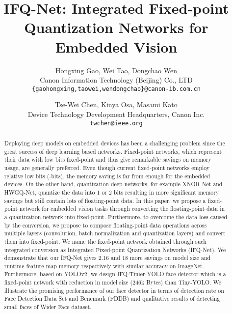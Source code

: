 \documentclass[10pt,twocolumn,letterpaper]{article}
\begin{document}
\title{IFQ-Net: Integrated Fixed-point Quantization Networks for Embedded Vision}


\author{Hongxing Gao, Wei Tao, Dongchao Wen\\
Canon Information Technology (Beijing) Co., LTD\\
{\tt\small \{gaohongxing,taowei,wendongchao\}@canon-ib.com.cn}
\and
Tse-Wei Chen, Kinya Osa, Masami Kato\\
Device Technology Development Headquarters, Canon Inc.\\
{\tt\small twchen@ieee.org}
}

\maketitle
\thispagestyle{empty}


\begin{abstract}
Deploying deep models on embedded devices has been a challenging problem since the great success of deep learning based networks. Fixed-point networks, which represent their data with low bits fixed-point and thus give remarkable savings on memory usage, are generally preferred. Even though current fixed-point networks employ relative low bits (-bits), the memory saving is far from enough for the embedded devices. On the other hand, quantization deep networks, for example XNOR-Net and HWGQ-Net, quantize the data into 1 or 2 bits resulting in more significant memory savings but still contain lots of floating-point data. In this paper, we propose a fixed-point network for embedded vision tasks through converting the floating-point data in a quantization network into fixed-point.  Furthermore, to overcome the data loss caused by the conversion, we propose to compose floating-point data operations across multiple layers (\eg convolution, batch normalization and quantization layers) and convert them into fixed-point. We name the fixed-point network obtained through such integrated conversion as Integrated Fixed-point Quantization Networks (IFQ-Net). We demonstrate that our IFQ-Net gives 2.16  and 18  more savings on model size and runtime feature map memory respectively with similar accuracy on ImageNet. Furthermore, based on YOLOv2, we design IFQ-Tinier-YOLO face detector which is a fixed-point network with  reduction in model size (246k Bytes) than Tiny-YOLO. We illustrate the promising performance of our face detector in terms of detection rate on Face Detection Data Set and Bencmark (FDDB) and qualitative results of detecting small faces of Wider Face dataset.





\end{abstract}
\end{document}
